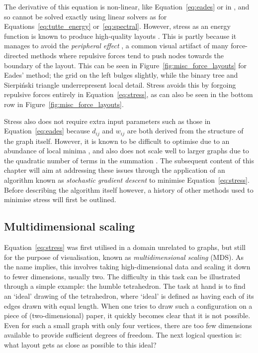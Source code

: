 The derivative of this equation is non-linear, like Equation~\eqref{eq:eades} or in \cite{Fruchterman1991, Frick1995}, and so cannot be solved exactly using linear solvers as for Equations~\eqref{eq:tutte_energy} or~\eqref{eq:spectral}.
However, stress as an energy function is known to produce high-quality layouts \cite{Brandes2008}. This is partly because it manages to avoid the \emph{peripheral effect} \cite{Hu2005}, a common visual artifact of many force-directed methods where repulsive forces tend to push nodes towards the boundary of the layout. This can be seen in Figure~\ref{fig:misc_force_layouts} for Eades' method; the grid on the left bulges slightly, while the binary tree and Sierpi\'nski triangle underrepresent local detail.
Stress avoids this by forgoing repulsive forces entirely in Equation~\eqref{eq:stress}, as can also be seen in the bottom row in Figure~\ref{fig:misc_force_layouts}.

Stress also does not require extra input parameters such as those in Equation~\eqref{eq:eades} because $d_{ij}$ and $w_{ij}$ are both derived from the structure of the graph itself.
However, it is known to be difficult to optimise due to an abundance of local minima \cite{DeLeeuw1988, Gansner2004}, and also does not scale well to larger graphs due to the quadratic number of terms in the summation \cite{Brandes2008, Hu2005}.
The subsequent content of this chapter will aim at addressing these issues through the application of an algorithm known as \emph{stochastic gradient descent} to minimise Equation~\eqref{eq:stress}. Before describing the algorithm itself however, a history of other methods used to minimise stress will first be outlined.

\subsection{Multidimensional scaling}
\label{sec:stress_background}
Equation~\eqref{eq:stress} was first utilised in a domain unrelated to graphs, but still for the purpose of visualisation, known as \emph{multidimensional scaling} (MDS). As the name implies, this involves taking high-dimensional data and scaling it down to fewer dimensions, usually two.
The difficulty in this task can be illustrated through a simple example: the humble tetrahedron. The task at hand is to find an `ideal' drawing of the tetrahedron, where `ideal' is defined as having each of its edges drawn with equal length. When one tries to draw such a configuration on a piece of (two-dimensional) paper, it quickly becomes clear that it is not possible.
Even for such a small graph with only four vertices, there are too few dimensions available to provide sufficient degrees of freedom.%
The next logical question is: what layout gets as close as possible to this ideal?

